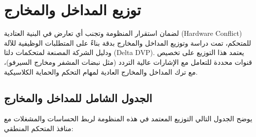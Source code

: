 \documentclass[12pt,a4paper,fleqn]{report}
\begin{document}
\chapter{توزيع المداخل والمخارج}
\label{ch:io_mapping}

لضمان استقرار المنظومة وتجنب أي تعارض في البنية العتادية \textenglish{(Hardware Conflict)} للمتحكم، تمت دراسة وتوزيع المداخل والمخارج بدقة بناءً على المتطلبات الوظيفية للآلة ودليل الشركة المصنعة لمتحكمات دلتا \textenglish{(Delta DVP)}. يعتمد هذا التوزيع على تخصيص قنوات محددة للتعامل مع الإشارات عالية التردد (مثل نبضات المشفر ومخارج السيرفو)، مع ترك المداخل والمخارج العادية لمهام التحكم والحماية الكلاسيكية.

\section{الجدول الشامل للمداخل والمخارج}
يوضح الجدول التالي التوزيع المعتمد في هذه المنظومة لربط الحساسات والمشغلات مع منافذ المتحكم المنطقي:
\end{document}
